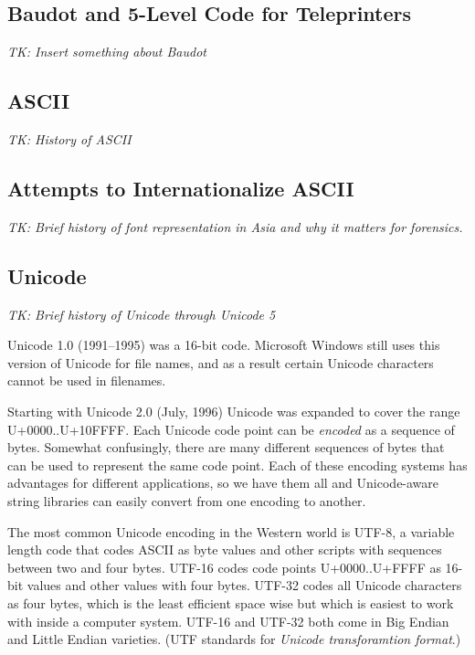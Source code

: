 \subsection{Baudot and 5-Level Code for Teleprinters}

\emph{TK: Insert something about Baudot}

\subsection{ASCII}

\emph{TK: History of ASCII}

\subsection{Attempts to Internationalize ASCII}

\emph{TK: Brief history of font representation in Asia and why it
  matters for forensics.}

\subsection{Unicode}

\emph{TK: Brief history of Unicode through Unicode 5}

Unicode 1.0 (1991--1995) was a 16-bit code. Microsoft Windows still uses this version of Unicode for file names, and as a result certain Unicode characters cannot be used in filenames.

Starting with Unicode 2.0 (July, 1996) Unicode was expanded to cover the range U+0000..U+10FFFF. Each Unicode code point can be \emph{encoded} as a sequence of bytes. Somewhat confusingly, there are many different sequences of bytes that can be used to represent the same code point. Each of these encoding systems has advantages for different applications, so we have them all and Unicode-aware string libraries can easily convert from one encoding to another.

The most common Unicode encoding in the Western world is UTF-8, a
variable length code that  codes ASCII  as  byte values and other
scripts with sequences between two and four bytes.  UTF-16 codes code
points U+0000..U+FFFF as 16-bit values and other values with four bytes. UTF-32 codes all Unicode characters as four bytes, which is the least efficient space wise but which is easiest to work with inside a computer system. UTF-16 and UTF-32 both come in Big Endian and Little Endian varieties. (UTF standards for \emph{Unicode transforamtion format}.)

